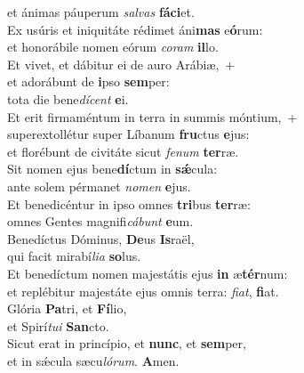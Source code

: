 \oddverse et ánimas páuperum \textit{sal}\textit{vas} \textbf{fá}\textbf{ci}et.\\
\evenverse Ex usúris et iniquitáte rédimet áni\textbf{mas} e\textbf{ó}rum:~\*\\
\evenverse et honorábile nomen eórum \textit{co}\textit{ram} \textbf{il}lo.\\
\oddverse Et vivet, et dábitur ei de auro Arábiæ,~+\\
\oddverse  et adorábunt de \textbf{i}pso \textbf{sem}per:~\*\\
\oddverse tota die bene\textit{dí}\textit{cent} \textbf{e}i.\\
\evenverse Et erit firmaméntum in terra in summis móntium,~+\\
\evenverse  superextollétur super Líbanum \textbf{fru}ctus \textbf{e}jus:~\*\\
\evenverse et florébunt de civitáte sicut \textit{fe}\textit{num} \textbf{ter}ræ.\\
\oddverse Sit nomen ejus bene\textbf{dí}ctum in \textbf{sǽ}cula:~\*\\
\oddverse ante solem pérmanet \textit{no}\textit{men} \textbf{e}jus.\\
\evenverse Et benedicéntur in ipso omnes \textbf{tri}bus \textbf{ter}ræ:~\*\\
\evenverse omnes Gentes magnifi\textit{cá}\textit{bunt} \textbf{e}um.\\
\oddverse Benedíctus Dóminus, \textbf{De}us \textbf{Is}raël,~\*\\
\oddverse qui facit mirabí\textit{li}\textit{a} \textbf{so}lus.\\
\evenverse Et benedíctum nomen majestátis ejus \textbf{in} æ\textbf{tér}num:~\*\\
\evenverse et replébitur majestáte ejus omnis terra: \textit{fi}\textit{at}, \textbf{fi}at.\\
\oddverse Glória \textbf{Pa}tri, et \textbf{Fí}lio,~\*\\
\oddverse et Spirí\textit{tu}\textit{i} \textbf{San}cto.\\
\evenverse Sicut erat in princípio, et \textbf{nunc}, et \textbf{sem}per,~\*\\
\evenverse et in sǽcula sæcu\textit{ló}\textit{rum}. \textbf{A}men.\\
